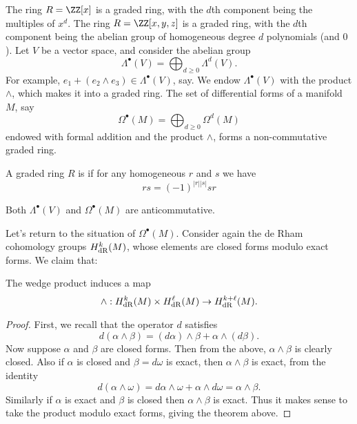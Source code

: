 \begin{example}
	\listhack
	\begin{enumerate}[(a)]
		\ii The ring $R = \ZZ[x]$ is a graded ring,
		with the $d$th component being the multiples of $x^d$.
		\ii The ring $R = \ZZ[x,y,z]$ is a graded ring,
		with the $d$th component being the abelian group
		of homogeneous degree $d$ polynomials (and $0$).
		\ii Let $V$ be a vector space, and consider
		the abelian group
		\[ \Lambda^\bullet(V) = \bigoplus_{d \ge 0} \Lambda^d(V). \]
		For example, $e_1 + (e_2 \wedge e_3) \in \Lambda^\bullet(V)$, say.
		We endow $\Lambda^\bullet(V)$ with the product $\wedge$,
		which makes it into a graded ring.
		\ii The set of differential forms of a manifold $M$,
		say \[ \Omega^\bullet(M) = \bigoplus_{d \ge 0} \Omega^d(M) \]
		endowed with formal addition and the product $\wedge$,
		forms a non-commutative graded ring.
	\end{enumerate}
\end{example}
\begin{definition}
	A graded ring $R$ is  if
	for any homogeneous $r$ and $s$ we have
	\[ rs = (-1)^{|r| |s|} sr \]
\end{definition}
\begin{example}
	Both $\Lambda^\bullet(V)$ and $\Omega^\bullet(M)$ are anticommutative.
\end{example}

Let's return to the situation of $\Omega^\bullet(M)$.
Consider again the de Rham cohomology groups $H_{\mathrm{dR}}^k(M)$,
whose elements are closed forms modulo exact forms.
We claim that:
\begin{lemma}
	The wedge product induces a map
	\[ \wedge : H_{\mathrm{dR}}^k(M) \times H_{\mathrm{dR}}^\ell(M) \to H_{\mathrm{dR}}^{k+\ell}(M). \]
\end{lemma}
\begin{proof}
	First, we recall that the operator $d$ satisfies
	\[
		d(\alpha \wedge \beta)
		= (d\alpha) \wedge \beta + \alpha \wedge (d\beta).
	\]
	Now suppose $\alpha$ and $\beta$ are closed forms.
	Then from the above, $\alpha \wedge \beta$ is clearly closed.
	Also if $\alpha$ is closed and $\beta = d\omega$ is exact,
	then $\alpha \wedge \beta$ is exact, from the identity
	\[ d(\alpha \wedge \omega)
		= d\alpha \wedge\omega + \alpha \wedge d\omega = \alpha \wedge \beta. \]
	Similarly if $\alpha$ is exact and $\beta$ is closed
	then $\alpha \wedge \beta$ is exact.
	Thus it makes sense to take the product modulo exact forms,
	giving the theorem above.
\end{proof}


